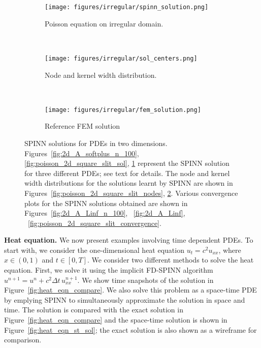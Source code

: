 \documentclass[12pt]{article}
\begin{document}
\begin{figure}
\begin{subfigure}{0.32\textwidth}
\centering
\texttt{[image: figures/irregular/spinn\_solution.png]}
\caption{Poisson equation on irregular domain.}
\label{fig:poisson2d_irregular}
\end{subfigure}
~
\begin{subfigure}{0.32\textwidth}
\texttt{[image: figures/irregular/sol\_centers.png]}
\caption{Node and kernel width distribution.}
\label{fig:poisson2d_irregular_nodes}
\end{subfigure}
~
\begin{subfigure}{0.32\textwidth}
\texttt{[image: figures/irregular/fem\_solution.png]}
\caption{Reference FEM solution}
\label{fig:poisson2d_irregular_fem}
\end{subfigure}
\caption{SPINN solutions for PDEs in two dimensions.  Figures~\ref{fig:2d_A_softplus_n_100}, \ref{fig:poisson_2d_square_slit_sol}, \ref{fig:poisson2d_irregular} represent the SPINN solution for three different PDEs; see text for details. The node and kernel width distributions for the solutions learnt by SPINN are shown in Figures~\ref{fig:poisson_2d_square_slit_nodes}, \ref{fig:poisson2d_irregular_nodes}. Various convergence plots for the SPINN solutions obtained are shown in Figures~\ref{fig:2d_A_Linf_n_100}, ~\ref{fig:2d_A_Linf},  ~\ref{fig:poisson_2d_square_slit_convergence}.}
\label{fig:spinn_pde2d}
\end{figure}

\textbf{Heat equation.}
We now present examples involving time dependent PDEs. To start with, we consider the one-dimensional heat equation $u_t = c^2 u_{xx}$, where $x \in (0,1)$ and $t \in [0, T]$. We consider two different methods to solve the heat equation. First, we solve it using the implicit FD-SPINN algorithm $u^{n+1} = u^n + c^2 \Delta t \, u^{n+1}_{xx}$. We show time snapshots of the solution in Figure~\ref{fig:heat_eqn_compare}. We also solve this problem as a space-time PDE by emplying SPINN to simultaneously approximate the solution in space and time. The solution is compared with the exact solution in Figure~\ref{fig:heat_eqn_compare} and the space-time solution is shown in Figure~\ref{fig:heat_eqn_st_sol}; the exact solution is also shown as a wireframe for comparison.
\end{document}

